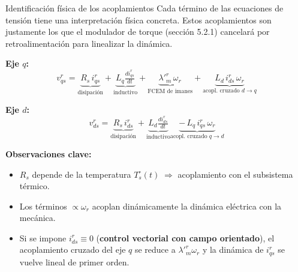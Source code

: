 \documentclass[aspectratio=169,t]{beamer}
\begin{document}
\begin{frame}{Identificación física de los acoplamientos}
{\small\color{uncGray}Cada término de las ecuaciones de tensión tiene una interpretación física concreta. Estos acoplamientos son justamente los que el modulador de torque (sección 5.2.1) cancelará por retroalimentación para linealizar la dinámica.}\par
\vspace{4mm}

\textbf{Eje $q$:}
\begin{equation*}
v^{r}_{qs} = \underbrace{R_s\,i^{r}_{qs}}_{\text{disipación}} + \underbrace{L_q\tfrac{di^{r}_{qs}}{dt}}_{\text{inductivo}} + \underbrace{\lambda'^r_m\,\omega_r}_{\text{FCEM de imanes}} + \underbrace{L_d\,i^{r}_{ds}\,\omega_r}_{\text{acopl.\ cruzado $d\to q$}}
\end{equation*}

\textbf{Eje $d$:}
\begin{equation*}
v^{r}_{ds} = \underbrace{R_s\,i^{r}_{ds}}_{\text{disipación}} + \underbrace{L_d\tfrac{di^{r}_{ds}}{dt}}_{\text{inductivo}} \underbrace{-\,L_q\,i^{r}_{qs}\,\omega_r}_{\text{acopl.\ cruzado $q\to d$}}
\end{equation*}

\vspace{2mm}
\textbf{Observaciones clave:}
\begin{itemize}\small
\item $R_s$ depende de la temperatura $T_s^\circ(t) \;\Rightarrow$ acoplamiento con el subsistema térmico.
\item Los términos $\propto \omega_r$ acoplan dinámicamente la dinámica eléctrica con la mecánica.
\item Si se impone $i^{r}_{ds}\equiv 0$ (\textbf{control vectorial con campo orientado}), el acoplamiento cruzado del eje $q$ se reduce a $\lambda'^r_m\omega_r$ y la dinámica de $i^{r}_{qs}$ se vuelve lineal de primer orden.
\end{itemize}
\end{frame}
\end{document}
